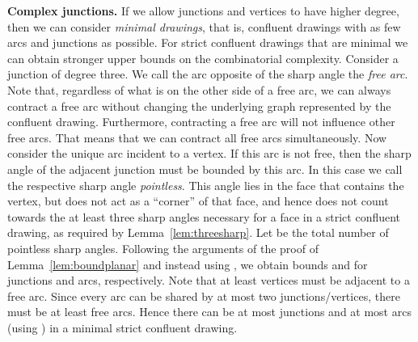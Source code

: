 \documentclass{llncs}
\begin{document}
\smallskip\noindent
{\bf Complex junctions.} If we allow junctions and vertices to have higher degree, then we can consider \emph{minimal drawings}, that is, confluent drawings with as few arcs and junctions as possible. For strict confluent drawings that are minimal we can obtain stronger upper bounds on the combinatorial complexity. Consider a junction of degree three. We call the arc opposite of the sharp angle the \emph{free arc}. Note that, regardless of what is on the other side of a free arc, we can always contract a free arc without changing the underlying graph represented by the confluent drawing. Furthermore, contracting a free arc will not influence other free arcs. That means that we can contract all free arcs simultaneously. Now consider the unique arc incident to a vertex. If this arc is not free, then the sharp angle of the adjacent junction must be bounded by this arc. In this case we call the respective sharp angle \emph{pointless}. This angle lies in the face that contains the vertex, but does not act as a ``corner'' of that face, and hence does not count towards the at least three sharp angles necessary for a face in a strict confluent drawing, as required by Lemma~\ref{lem:threesharp}. Let  be the total number of pointless sharp angles. Following the arguments of the proof of Lemma~\ref{lem:boundplanar} and instead using , we obtain bounds  and  for junctions and arcs, respectively. Note that at least  vertices must be adjacent to a free arc. Since every arc can be shared by at most two junctions/vertices, there must be at least  free arcs. Hence there can be at most  junctions and at most  arcs (using ) in a minimal strict confluent drawing.
\end{document}
